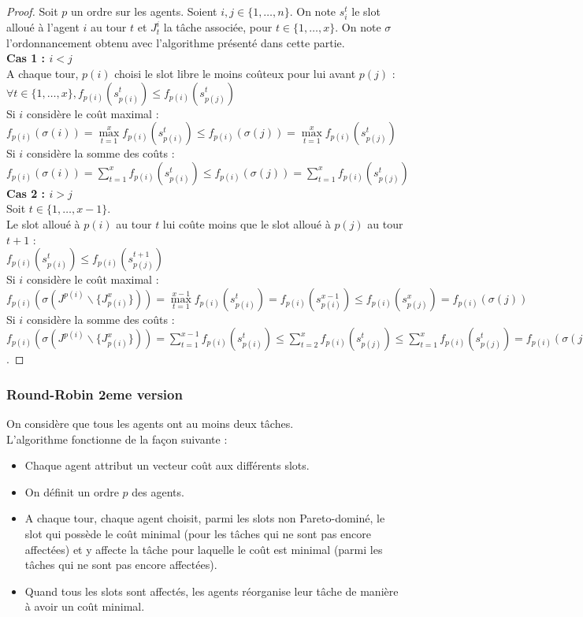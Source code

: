 \documentclass[12pt]{article}
\theoremstyle{definition}
\begin{document}
\begin{proof}
Soit $p$ un ordre sur les agents. Soient $i, j \in \{1, \dots, n\}$. On note $s_i^t$ le slot alloué à l'agent $i$ au tour $t$ et $J^i_t$ la tâche associée, pour $t\in\{1,\dots,x\}$. On note $\sigma$ l'ordonnancement obtenu avec l'algorithme présenté dans cette partie.\\
\textbf{Cas 1 : $i<j$}\\
A chaque tour, $p(i)$ choisi le slot libre le moins coûteux pour lui avant $p(j)$ :\\
 $\forall t\in \{1, \dots, x\}, f_{p(i)}(s^t_{p(i)})\leq f_{p(i)}(s^t_{p(j)})$\\
 Si $i$ considère le coût maximal : $f_{p(i)}(\sigma(i)) = \max\limits_{t = 1}^x f_{p(i)}(s^t_{p(i)}) \leq f_{p(i)}(\sigma(j)) = \max\limits_{t = 1}^x f_{p(i)}(s^t_{p(j)})$\\
 Si $i$ considère la somme des coûts : $f_{p(i)}(\sigma(i)) = \sum\limits_{t = 1}^x f_{p(i)}(s^t_{p(i)})\leq f_{p(i)}(\sigma(j)) = \sum\limits_{t = 1}^x f_{p(i)}(s^t_{p(j)})$\\
\textbf{Cas 2 : $i>j$}\\
Soit $t\in\{1,\dots,x-1\}$.\\
Le slot alloué à $p(i)$ au tour $t$ lui coûte moins que le slot alloué à $p(j)$ au tour $t+1$ : \\
$f_{p(i)}(s^t_{p(i)})\leq f_{p(i)}(s^{t+1}_{p(j)})$\\
Si $i$ considère le coût maximal : \\
$f_{p(i)}(\sigma(J^{p(i)}\backslash\{J_{p(i)}^x\})) = \max\limits_{t = 1}^{x-1} f_{p(i)}(s^t_{p(i)}) = f_{p(i)}(s^{x-1}_{p(i)}) \leq f_{p(i)}(s^x_{p(j)}) = f_{p(i)}(\sigma(j))$\\
Si $i$ considère la somme des coûts : \\
$f_{p(i)}(\sigma(J^{p(i)}\backslash\{J_{p(i)}^x\})) = \sum\limits_{t = 1}^{x-1} f_{p(i)}(s^t_{p(i)}) \leq \sum\limits_{t = 2}^{x} f_{p(i)}(s^t_{p(j)}) \leq \sum\limits_{t = 1}^{x} f_{p(i)}(s^t_{p(j)}) = f_{p(i)}(\sigma(j))$.
\end{proof}

\subsubsection{Round-Robin 2eme version}
\noindent
On considère que tous les agents ont au moins deux tâches.\\
L'algorithme fonctionne de la façon suivante :
\begin{itemize}
	\item Chaque agent attribut un vecteur coût aux différents slots.
	\item On définit un ordre $p$ des agents.
	\item A chaque tour, chaque agent choisit, parmi les slots non Pareto-dominé, le slot qui possède le coût minimal (pour les tâches qui ne sont pas encore affectées) et y affecte la tâche pour laquelle le coût est minimal (parmi les tâches qui ne sont pas encore affectées).
	\item Quand tous les slots sont affectés, les agents réorganise leur tâche de manière à avoir un coût minimal.
\end{itemize}
\end{document}
